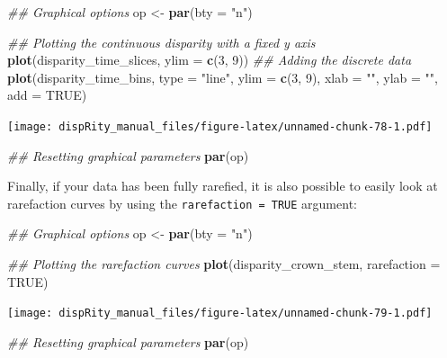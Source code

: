 \documentclass[]{book}
\newenvironment{Shaded}{\begin{snugshade}}{\end{snugshade}}
\newcommand{\CommentTok}[1]{\textcolor[rgb]{0.56,0.35,0.01}{\textit{#1}}}
\newcommand{\DataTypeTok}[1]{\textcolor[rgb]{0.13,0.29,0.53}{#1}}
\newcommand{\DecValTok}[1]{\textcolor[rgb]{0.00,0.00,0.81}{#1}}
\newcommand{\KeywordTok}[1]{\textcolor[rgb]{0.13,0.29,0.53}{\textbf{#1}}}
\newcommand{\NormalTok}[1]{#1}
\newcommand{\OtherTok}[1]{\textcolor[rgb]{0.56,0.35,0.01}{#1}}
\newcommand{\StringTok}[1]{\textcolor[rgb]{0.31,0.60,0.02}{#1}}
\begin{document}
\begin{Shaded}
\begin{Highlighting}[]
\CommentTok{## Graphical options}
\NormalTok{op <-}\StringTok{ }\KeywordTok{par}\NormalTok{(}\DataTypeTok{bty =} \StringTok{"n"}\NormalTok{)}

\CommentTok{## Plotting the continuous disparity with a fixed y axis}
\KeywordTok{plot}\NormalTok{(disparity_time_slices, }\DataTypeTok{ylim =} \KeywordTok{c}\NormalTok{(}\DecValTok{3}\NormalTok{, }\DecValTok{9}\NormalTok{))}
\CommentTok{## Adding the discrete data}
\KeywordTok{plot}\NormalTok{(disparity_time_bins, }\DataTypeTok{type =} \StringTok{"line"}\NormalTok{, }\DataTypeTok{ylim =} \KeywordTok{c}\NormalTok{(}\DecValTok{3}\NormalTok{, }\DecValTok{9}\NormalTok{),}
     \DataTypeTok{xlab =} \StringTok{""}\NormalTok{, }\DataTypeTok{ylab =} \StringTok{""}\NormalTok{, }\DataTypeTok{add =} \OtherTok{TRUE}\NormalTok{)}
\end{Highlighting}
\end{Shaded}

\texttt{[image: dispRity\_manual\_files/figure-latex/unnamed-chunk-78-1.pdf]}

\begin{Shaded}
\begin{Highlighting}[]
\CommentTok{## Resetting graphical parameters}
\KeywordTok{par}\NormalTok{(op)}
\end{Highlighting}
\end{Shaded}

Finally, if your data has been fully rarefied, it is also possible to easily look at rarefaction curves by using the \texttt{rarefaction\ =\ TRUE} argument:

\begin{Shaded}
\begin{Highlighting}[]
\CommentTok{## Graphical options}
\NormalTok{op <-}\StringTok{ }\KeywordTok{par}\NormalTok{(}\DataTypeTok{bty =} \StringTok{"n"}\NormalTok{)}

\CommentTok{## Plotting the rarefaction curves}
\KeywordTok{plot}\NormalTok{(disparity_crown_stem, }\DataTypeTok{rarefaction =} \OtherTok{TRUE}\NormalTok{)}
\end{Highlighting}
\end{Shaded}

\texttt{[image: dispRity\_manual\_files/figure-latex/unnamed-chunk-79-1.pdf]}

\begin{Shaded}
\begin{Highlighting}[]
\CommentTok{## Resetting graphical parameters}
\KeywordTok{par}\NormalTok{(op)}
\end{Highlighting}
\end{Shaded}
\end{document}
